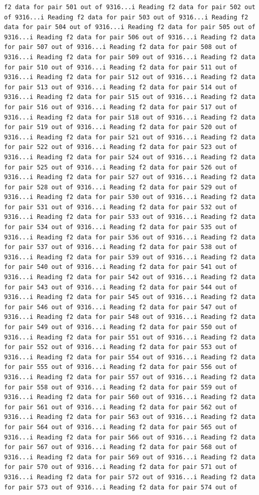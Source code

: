 \documentclass[
]{article}
\begin{document}
\begin{verbatim}
f2 data for pair 501 out of 9316...i Reading f2 data for pair 502 out of 9316...i Reading f2 data for pair 503 out of 9316...i Reading f2 data for pair 504 out of 9316...i Reading f2 data for pair 505 out of 9316...i Reading f2 data for pair 506 out of 9316...i Reading f2 data for pair 507 out of 9316...i Reading f2 data for pair 508 out of 9316...i Reading f2 data for pair 509 out of 9316...i Reading f2 data for pair 510 out of 9316...i Reading f2 data for pair 511 out of 9316...i Reading f2 data for pair 512 out of 9316...i Reading f2 data for pair 513 out of 9316...i Reading f2 data for pair 514 out of 9316...i Reading f2 data for pair 515 out of 9316...i Reading f2 data for pair 516 out of 9316...i Reading f2 data for pair 517 out of 9316...i Reading f2 data for pair 518 out of 9316...i Reading f2 data for pair 519 out of 9316...i Reading f2 data for pair 520 out of 9316...i Reading f2 data for pair 521 out of 9316...i Reading f2 data for pair 522 out of 9316...i Reading f2 data for pair 523 out of 9316...i Reading f2 data for pair 524 out of 9316...i Reading f2 data for pair 525 out of 9316...i Reading f2 data for pair 526 out of 9316...i Reading f2 data for pair 527 out of 9316...i Reading f2 data for pair 528 out of 9316...i Reading f2 data for pair 529 out of 9316...i Reading f2 data for pair 530 out of 9316...i Reading f2 data for pair 531 out of 9316...i Reading f2 data for pair 532 out of 9316...i Reading f2 data for pair 533 out of 9316...i Reading f2 data for pair 534 out of 9316...i Reading f2 data for pair 535 out of 9316...i Reading f2 data for pair 536 out of 9316...i Reading f2 data for pair 537 out of 9316...i Reading f2 data for pair 538 out of 9316...i Reading f2 data for pair 539 out of 9316...i Reading f2 data for pair 540 out of 9316...i Reading f2 data for pair 541 out of 9316...i Reading f2 data for pair 542 out of 9316...i Reading f2 data for pair 543 out of 9316...i Reading f2 data for pair 544 out of 9316...i Reading f2 data for pair 545 out of 9316...i Reading f2 data for pair 546 out of 9316...i Reading f2 data for pair 547 out of 9316...i Reading f2 data for pair 548 out of 9316...i Reading f2 data for pair 549 out of 9316...i Reading f2 data for pair 550 out of 9316...i Reading f2 data for pair 551 out of 9316...i Reading f2 data for pair 552 out of 9316...i Reading f2 data for pair 553 out of 9316...i Reading f2 data for pair 554 out of 9316...i Reading f2 data for pair 555 out of 9316...i Reading f2 data for pair 556 out of 9316...i Reading f2 data for pair 557 out of 9316...i Reading f2 data for pair 558 out of 9316...i Reading f2 data for pair 559 out of 9316...i Reading f2 data for pair 560 out of 9316...i Reading f2 data for pair 561 out of 9316...i Reading f2 data for pair 562 out of 9316...i Reading f2 data for pair 563 out of 9316...i Reading f2 data for pair 564 out of 9316...i Reading f2 data for pair 565 out of 9316...i Reading f2 data for pair 566 out of 9316...i Reading f2 data for pair 567 out of 9316...i Reading f2 data for pair 568 out of 9316...i Reading f2 data for pair 569 out of 9316...i Reading f2 data for pair 570 out of 9316...i Reading f2 data for pair 571 out of 9316...i Reading f2 data for pair 572 out of 9316...i Reading f2 data for pair 573 out of 9316...i Reading f2 data for pair 574 out of 
\end{verbatim}
\end{document}
